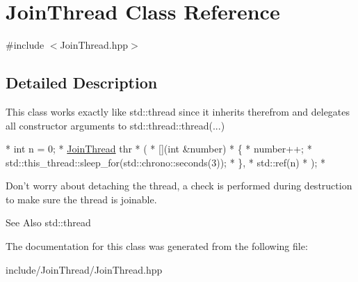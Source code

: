 \hypertarget{class_join_thread}{\section{Join\-Thread Class Reference}
\label{class_join_thread}
}


{\ttfamily \#include $<$Join\-Thread.\-hpp$>$}



\subsection{Detailed Description}
This class works exactly like std\-::thread since it inherits therefrom and delegates all constructor arguments to std\-::thread\-::thread(...)


\begin{DoxyCode}
*  \textcolor{keywordtype}{int} n = 0;
*  \hyperlink{class_join_thread}{JoinThread} thr
*  (
*      [](\textcolor{keywordtype}{int} &number)
*      \{
*          number++;
*          std::this\_thread::sleep\_for(std::chrono::seconds(3));
*      \},
*      std::ref(n)
*  );
*  
\end{DoxyCode}


Don't worry about detaching the thread, a check is performed during destruction to make sure the thread is joinable.

\begin{DoxySeeAlso}{See Also}
std\-::thread 
\end{DoxySeeAlso}


The documentation for this class was generated from the following file\-:\begin{DoxyCompactItemize}
\item 
include/\-Join\-Thread/Join\-Thread.\-hpp\end{DoxyCompactItemize}
